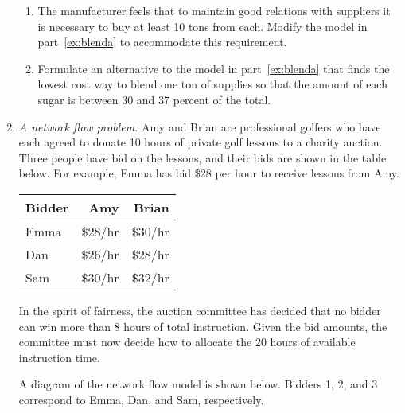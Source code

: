\begin{enumerate}
\begin{enumerate}
\item The manufacturer feels that to maintain good relations with suppliers
it is necessary to buy at least 10 tons from each. Modify the model in
part~\ref{ex:blenda} to accommodate this requirement.

\item Formulate an alternative to the model in part~\ref{ex:blenda} that finds the 
lowest cost way to blend one ton of supplies so that the amount of each 
sugar is between 30 and 37 percent of the total.
\end{enumerate}

\item \emph{A network flow problem.}  Amy and Brian are professional
  golfers who have each agreed to donate 10 hours of private golf
  lessons to a charity auction. Three people have bid on the lessons,
  and their bids are shown in the table below. For example, Emma has
  bid \$28 per hour to receive lessons from Amy.

\begin{tabular}{lrr}
Bidder & Amy & Brian \\ \hline
Emma & \$28/hr & \$30/hr \\
Dan     & \$26/hr & \$28/hr \\
Sam  & \$30/hr & \$32/hr
\end{tabular}

In the spirit of fairness, the auction committee has decided that no bidder can win 
more than 8 hours of total instruction. Given the bid amounts, the committee must now
decide how to allocate the 20 hours of available instruction time.

\begin{solution}
  \bs A diagram of the network flow model is shown below. Bidders 1, 2,
  and 3 correspond to Emma, Dan, and Sam, respectively.
\vspace{.2in}
\begin{center}
\end{center}
\end{solution}
\end{enumerate}
